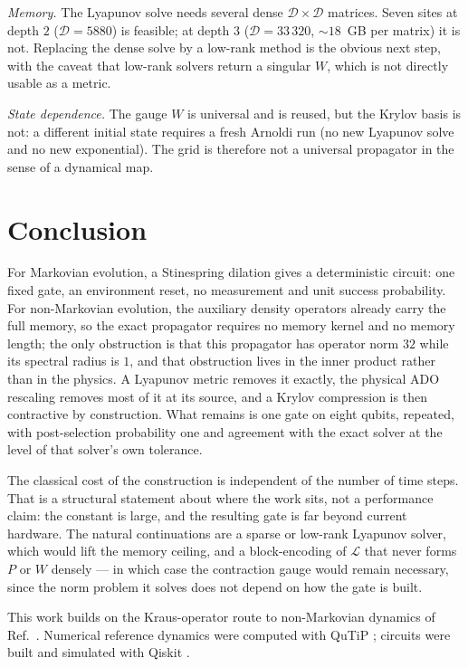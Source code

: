 \documentclass[aps,prx,twocolumn,superscriptaddress,nofootinbib,longbibliography]{revtex4-2}
\theoremstyle{plain}
\begin{document}
\emph{Memory.}  The Lyapunov solve needs several dense
$\mathcal D\times\mathcal D$ matrices.  Seven sites at depth $2$ ($\mathcal D=5880$)
is feasible; at depth $3$ ($\mathcal D=33\,320$, $\sim\!18$~GB per matrix) it is
not.  Replacing the dense solve by a low-rank method is the obvious next step,
with the caveat that low-rank solvers return a singular $W$, which is not
directly usable as a metric.

\emph{State dependence.}  The gauge $W$ is universal and is reused, but the
Krylov basis is not: a different initial state requires a fresh Arnoldi run
(no new Lyapunov solve and no new exponential).  The grid is therefore not a
universal propagator in the sense of a dynamical map.

\section{Conclusion}

For Markovian evolution, a Stinespring dilation gives a deterministic circuit:
one fixed gate, an environment reset, no measurement and unit success
probability.  For non-Markovian evolution, the auxiliary density operators
already carry the full memory, so the exact propagator requires no memory kernel
and no memory length; the only obstruction is that this propagator has operator
norm $32$ while its spectral radius is $1$, and that obstruction lives in the
inner product rather than in the physics.  A Lyapunov metric removes it exactly,
the physical ADO rescaling removes most of it at its source, and a Krylov
compression is then contractive by construction.  What remains is one gate on
eight qubits, repeated, with post-selection probability one and agreement with
the exact solver at the level of that solver's own tolerance.

The classical cost of the construction is independent of the number of time
steps.  That is a structural statement about where the work sits, not a
performance claim: the constant is large, and the resulting gate is far beyond
current hardware.  The natural continuations are a sparse or low-rank Lyapunov
solver, which would lift the memory ceiling, and a block-encoding of
$\mathcal L$ that never forms $P$ or $W$ densely --- in which case the
contraction gauge would remain necessary, since the norm problem it solves does
not depend on how the gate is built.

\begin{acknowledgments}
This work builds on the Kraus-operator route to non-Markovian dynamics of
Ref.~.  Numerical reference dynamics were computed
with QuTiP \cite{Johansson2013,Lambert2023}; circuits were built and simulated
with Qiskit \cite{Qiskit}.
\end{acknowledgments}



\end{document}
